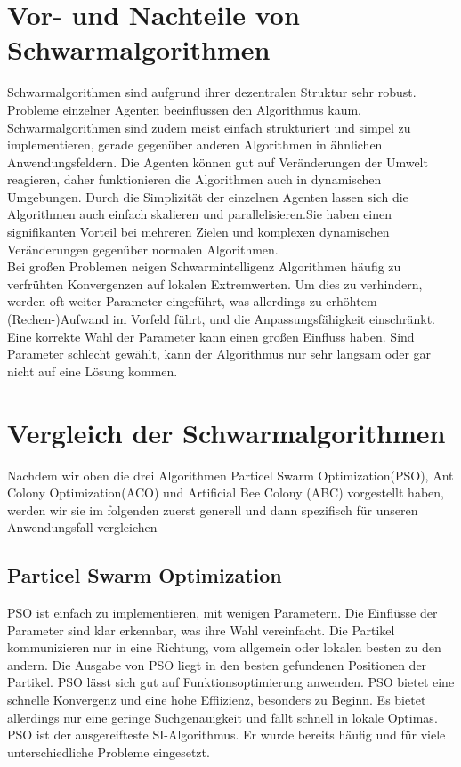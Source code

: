 \label{ch:comparison}
\section{Vor- und Nachteile von Schwarmalgorithmen}
\label{sec:comparison}
Schwarmalgorithmen sind aufgrund ihrer dezentralen Struktur sehr robust. Probleme einzelner Agenten beeinflussen den Algorithmus kaum. Schwarmalgorithmen sind zudem meist einfach strukturiert und simpel zu implementieren, gerade gegenüber anderen Algorithmen in ähnlichen Anwendungsfeldern. Die Agenten können gut auf Veränderungen der Umwelt reagieren, daher funktionieren die Algorithmen auch in dynamischen Umgebungen. Durch die Simplizität der einzelnen Agenten lassen sich die Algorithmen auch einfach skalieren und parallelisieren.Sie haben einen signifikanten Vorteil bei mehreren Zielen und komplexen dynamischen Veränderungen gegenüber normalen Algorithmen. \\

Bei großen Problemen neigen Schwarmintelligenz Algorithmen häufig zu verfrühten Konvergenzen auf lokalen Extremwerten. Um dies zu verhindern, werden oft weiter Parameter eingeführt, was allerdings zu erhöhtem (Rechen-)Aufwand im Vorfeld führt, und die Anpassungsfähigkeit einschränkt.\cite {wu2022review} Eine korrekte Wahl der Parameter kann einen großen Einfluss haben. Sind Parameter schlecht gewählt, kann der Algorithmus nur sehr langsam oder gar nicht auf eine Lösung kommen.

\section{Vergleich der Schwarmalgorithmen}

Nachdem wir oben die drei Algorithmen Particel Swarm Optimization(PSO), Ant Colony Optimization(ACO) und  Artificial Bee Colony (ABC) vorgestellt haben, werden wir sie im folgenden zuerst generell und dann spezifisch für unseren Anwendungsfall vergleichen\\

\subsection{Particel Swarm Optimization}
PSO ist einfach zu implementieren, mit wenigen Parametern. Die Einflüsse der Parameter sind klar erkennbar, was ihre Wahl vereinfacht. Die Partikel kommunizieren nur in eine Richtung, vom allgemein oder lokalen besten zu den andern. Die Ausgabe von PSO liegt in den besten gefundenen Positionen der Partikel. PSO lässt sich gut auf Funktionsoptimierung anwenden. PSO bietet eine schnelle Konvergenz und eine hohe Effiizienz, besonders zu Beginn. Es bietet allerdings nur eine geringe Suchgenauigkeit und fällt schnell in lokale Optimas. \cite {yu2015swarm} PSO ist der ausgereifteste SI-Algorithmus. Er wurde bereits häufig und für viele unterschiedliche Probleme eingesetzt. 


